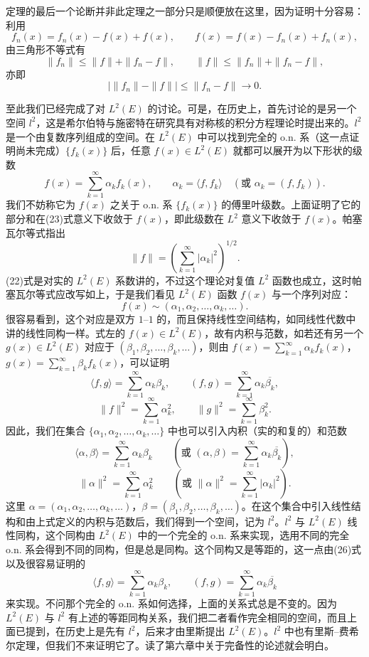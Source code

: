 定理的最后一个论断并非此定理之一部分只是顺便放在这里，因为证明十分容易：利用
\[
 f_n(x)=f_n(x)-f(x)+f(x),\qquad f(x)=f(x)-f_n(x)+f_n(x),
\]
由三角形不等式有
\[
 \|f_n\|\le\|f\|+\|f_n-f\|,\qquad \|f\|\le\|f_n\|+\|f_n-f\|,
\]
亦即
\[
 \bigl|\|f_n\|-\|f\|\bigr|\le\|f_n-f\|\to0.
\]

至此我们已经完成了对 $L^2(E)$ 的讨论。可是，在历史上，首先讨论的是另一个空间 $l^2$，这是希尔伯特与施密特在研究具有对称核的积分方程理论时提出来的。$l^2$ 是一个由复数序列组成的空间。在 $L^2(E)$ 中可以找到完全的 o.n. 系（这一点证明尚未完成）$\{f_k(x)\}$ 后，任意 $f(x)\in L^2(E)$ 就都可以展开为以下形状的级数
\begin{equation}
 f(x)=\sum_{k=1}^{\infty}\alpha_kf_k(x),\qquad \alpha_k=\langle f,f_k\rangle\quad(\text{或 }\alpha_k=(f,f_k)).
 \tag{25}
\end{equation}
我们不妨称它为 $f(x)$ 之关于 o.n. 系 $\{f_k(x)\}$ 的傅里叶级数。上面证明了它的部分和在(23)式意义下收敛于 $f(x)$，即此级数在 $L^2$ 意义下收敛于 $f(x)$。帕塞瓦尔等式指出
\begin{equation}
 \|f\|=\left(\sum_{k=1}^{\infty}|\alpha_k|^2\right)^{1/2}.
 \tag{26}
\end{equation}
(22)式是对实的 $L^2(E)$ 系数讲的，不过这个理论对复值 $L^2$ 函数也成立，这时帕塞瓦尔等式应改写如上，于是我们看见 $L^2(E)$ 函数 $f(x)$ 与一个序列对应：
\[
 f(x)\sim(\alpha_1,\alpha_2,\ldots,\alpha_k,\ldots).
\]
很容易看到，这个对应是双方 $1$--$1$ 的，而且保持线性空间结构，如同线性代数中讲的线性同构一样。式左的 $f(x)\in L^2(E)$，故有内积与范数，如若还有另一个 $g(x)\in L^2(E)$ 对应于 $(\beta_1,\beta_2,\ldots,\beta_k,\ldots)$，则由 $f(x)=\sum_{k=1}^{\infty}\alpha_kf_k(x)$，$g(x)=\sum_{k=1}^{\infty}\beta_kf_k(x)$，可以证明
\[
 \langle f,g\rangle=\sum_{k=1}^{\infty}\alpha_k\beta_k,\qquad (f,g)=\sum_{k=1}^{\infty}\alpha_k\overline{\beta_k},
\]
\[
 \|f\|^2=\sum_{k=1}^{\infty}\alpha_k^2,\qquad \|g\|^2=\sum_{k=1}^{\infty}\beta_k^2.
\]
因此，我们在集合 $\{\alpha_1,\alpha_2,\ldots,\alpha_k,\ldots\}$ 中也可以引入内积（实的和复的）和范数
\[
 \langle\alpha,\beta\rangle=\sum_{k=1}^{\infty}\alpha_k\beta_k\qquad\left(\text{或 }(\alpha,\beta)=\sum_{k=1}^{\infty}\alpha_k\overline{\beta_k}\right),
\]
\begin{equation}
 \|\alpha\|^2=\sum_{k=1}^{\infty}\alpha_k^2\qquad\left(\text{或 }\|\alpha\|^2=\sum_{k=1}^{\infty}|\alpha_k|^2\right).
 \tag{27}
\end{equation}
这里 $\alpha=(\alpha_1,\alpha_2,\ldots,\alpha_k,\ldots)$，$\beta=(\beta_1,\beta_2,\ldots,\beta_k,\ldots)$。在这个集合中引入线性结构和由上式定义的内积与范数后，我们得到一个空间，记为 $l^2$。$l^2$ 与 $L^2(E)$ 线性同构，这个同构由 $L^2(E)$ 中的一个完全的 o.n. 系来实现，选用不同的完全 o.n. 系会得到不同的同构，但是总是同构。这个同构又是等距的，这一点由(26)式以及很容易证明的
\[
 \langle f,g\rangle=\sum_{k=1}^{\infty}\alpha_k\beta_k,\qquad (f,g)=\sum_{k=1}^{\infty}\alpha_k\overline{\beta_k}
\]
来实现。不问那个完全的 o.n. 系如何选择，上面的关系式总是不变的。因为 $L^2(E)$ 与 $l^2$ 有上述的等距同构关系，我们把二者看作完全相同的空间，而且上面已提到，在历史上是先有 $l^2$，后来才由里斯提出 $L^2(E)$。$l^2$ 中也有里斯--费希尔定理，但我们不来证明它了。读了第六章中关于完备性的论述就会明白。

